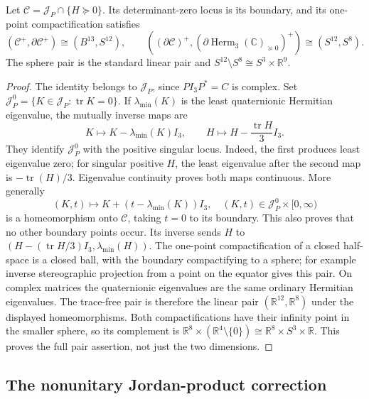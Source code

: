 \begin{proposition}\label{q444:pair-topology}
Let $\mathcal C=\mathcal J_P\cap\{H\succeq0\}$. Its determinant-zero
locus is its boundary, and its one-point compactification satisfies
\[
 (\mathcal C^+,\partial\mathcal C^+)\cong(B^{13},S^{12}),\qquad
 ((\partial\mathcal C)^+,
   (\partial\operatorname{Herm}_3(\mathbb C)_{\succeq0})^+)
 \cong(S^{12},S^8).
\]
The sphere pair is the standard linear pair and
$S^{12}\setminus S^8\cong S^3\times\mathbb R^9$.
\end{proposition}
\begin{proof}
The identity belongs to $\mathcal J_P$, since $PI_3P^*=C$ is complex.
Set $\mathcal J_P^0=\{K\in\mathcal J_P:\operatorname{tr}K=0\}$.
If $\lambda_{\min}(K)$ is the least quaternionic Hermitian eigenvalue,
the mutually inverse maps are
\[
 K\longmapsto K-\lambda_{\min}(K)I_3,
 \qquad H\longmapsto H-\frac{\operatorname{tr}H}{3}I_3.
\]
They identify $\mathcal J_P^0$ with the positive singular locus. Indeed,
the first produces least eigenvalue zero; for singular positive $H$, the
least eigenvalue after the second map is $-\operatorname{tr}(H)/3$.
Eigenvalue continuity proves both maps continuous. More generally
\[
 (K,t)\longmapsto K+(t-\lambda_{\min}(K))I_3,
 \quad (K,t)\in\mathcal J_P^0\times[0,\infty)
\]
is a homeomorphism onto $\mathcal C$, taking $t=0$ to its boundary.
This also proves that no other boundary points occur. Its inverse sends
$H$ to $(H-(\operatorname{tr}H/3)I_3,\lambda_{\min}(H))$.
The one-point compactification of a closed half-space is a closed ball,
with the boundary compactifying to a sphere; for example inverse
stereographic projection from a point on the equator gives this pair.
On complex matrices the quaternionic eigenvalues are the same ordinary
Hermitian eigenvalues. The trace-free pair is therefore the linear pair
$(\mathbb R^{12},\mathbb R^8)$ under the displayed homeomorphisms.
Both compactifications have their infinity point in the smaller sphere,
so its complement is
$\mathbb R^8\times(\mathbb R^4\setminus\{0\})
\cong\mathbb R^8\times S^3\times\mathbb R$.
This proves the full pair assertion, not just the two dimensions.
\end{proof}

\subsection{The nonunitary Jordan-product correction}

